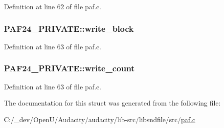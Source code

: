Definition at line 62 of file paf.\+c.

\subsubsection[{\texorpdfstring{write\+\_\+block}{write_block}}]{ P\+A\+F24\+\_\+\+P\+R\+I\+V\+A\+T\+E\+::write\+\_\+block}\hypertarget{struct_p_a_f24___p_r_i_v_a_t_e_a43ee03dbc915688f375f2a23243180fb}{}\label{struct_p_a_f24___p_r_i_v_a_t_e_a43ee03dbc915688f375f2a23243180fb}


Definition at line 63 of file paf.\+c.

\subsubsection[{\texorpdfstring{write\+\_\+count}{write_count}}]{ P\+A\+F24\+\_\+\+P\+R\+I\+V\+A\+T\+E\+::write\+\_\+count}\hypertarget{struct_p_a_f24___p_r_i_v_a_t_e_afda25e4990fbe3323e56427a20c0e933}{}\label{struct_p_a_f24___p_r_i_v_a_t_e_afda25e4990fbe3323e56427a20c0e933}


Definition at line 63 of file paf.\+c.



The documentation for this struct was generated from the following file\+:\begin{DoxyCompactItemize}
\item 
C\+:/\+\_\+dev/\+Open\+U/\+Audacity/audacity/lib-\/src/libsndfile/src/\hyperlink{paf_8c}{paf.\+c}\end{DoxyCompactItemize}
